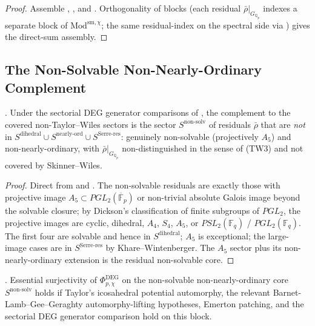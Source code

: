 \begin{proof}
Assemble ,
, and
. Orthogonality of blocks
(each residual \(\bar\rho|_{G_{\mathbb{Q}_{p}}}\) indexes a separate
block of \(\mathrm{Mod}^{\mathrm{sm},\chi}\); the same residual-index
on the spectral side via
) gives the direct-sum
assembly.
\end{proof}

\subsection{The Non-Solvable Non-Nearly-Ordinary Complement}

\begin{corollary}
\label{v4-arith:w6-e:cor:TW-removal-uncond}
\ClaimStatusNeedsVerification. Under the sectorial DEG generator
comparisons of , the
complement to the covered non-Taylor--Wiles sectors is the sector
\(S^{\mathrm{non\text{-}solv}}\) of residuals
\(\bar\rho\) that are \emph{not} in
\(S^{\mathrm{dihedral}}\cup S^{\mathrm{nearly\text{-}ord}}\cup
S^{\mathrm{Serre\text{-}res}}\): genuinely non-solvable (projectively
\(A_{5}\)) and non-nearly-ordinary, with \(\bar\rho|_{G_{\mathbb{Q}_{p}}}\)
non-distinguished in the sense of (TW3) and not covered by
Skinner--Wiles.
\end{corollary}

\begin{proof}
Direct from  and
. The non-solvable
residuals are exactly those with projective image
\(A_{5}\subset PGL_{2}(\overline{\mathbb{F}}_{p})\) or
non-trivial absolute Galois image beyond the solvable closure; by
Dickson's classification of finite subgroups of \(PGL_{2}\), the
projective images are cyclic, dihedral, \(A_{4}\), \(S_{4}\), \(A_{5}\),
or \(PSL_{2}(\mathbb{F}_{q})\) / \(PGL_{2}(\mathbb{F}_{q})\). The first
four are solvable and hence in \(S^{\mathrm{dihedral}}\); \(A_{5}\) is
exceptional; the large-image cases are in \(S^{\mathrm{Serre\text{-}res}}\)
by Khare--Wintenberger. The \(A_{5}\) sector plus its non-nearly-ordinary
extension is the residual non-solvable core.
\end{proof}

\begin{conjecture}
\label{v4-arith:w6-e:conj:TW-removal-ns-residual}
\ClaimStatusConjectured. Essential surjectivity of
\(\Phi^{\mathrm{DEG}}_{p,\chi}\) on the non-solvable
non-nearly-ordinary core \(S^{\mathrm{non\text{-}solv}}\) holds if
Taylor's icosahedral potential automorphy, the relevant
Barnet-Lamb--Gee--Geraghty automorphy-lifting hypotheses, Emerton
patching, and the sectorial DEG generator comparison hold on this
block.
\end{conjecture}

